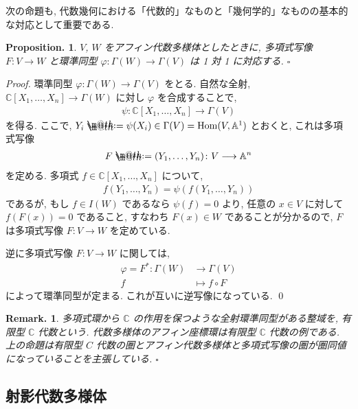 \documentclass[openany, a4paper, oneside]{jsbook}
\makeatletter
\newcommand*{\defeq}{\mathrel{\rlap{%
\raisebox{0.3ex}{$\m@th\cdot$}}%
\raisebox{-0.3ex}{$\m@th\cdot$}}%
=}
\theoremstyle{break}
\newtheorem{prop}[thm]{Proposition.}
\theoremstyle{breakdefn}
\newtheorem{rem}[thm]{Remark.}
\newcommand{\fin}{\hfill $\square$ \par}
\newcommand{\homo}{\mathrm{Hom}}
\newcommand{\map}{\longrightarrow}
\makeatother
\begin{document}
次の命題も, 代数幾何における「代数的」なものと「幾何学的」なものの基本的な対応として重要である.
\begin{prop}
$V$, $W$ をアフィン代数多様体としたときに,
多項式写像 $F \colon V \to W$ と環準同型 $\varphi \colon \Gamma (W) \to \Gamma (V)$ は 1 対 1 に対応する. \fin
\end{prop}
\begin{proof}
環準同型 $\varphi \colon \Gamma (W) \to \Gamma (V)$ をとる.
自然な全射, $\mathbb{C}[X_1,\dots,X_n] \to \Gamma (W)$ に対し $\varphi$ を合成することで,
\begin{align}
 \psi \colon \mathbb{C}[X_1,\dots,X_n] \map \Gamma (V)
\end{align}
を得る.
ここで, $Y_i \defeq  \psi (X_i) \in \Gamma (V) = \homo (V, \mathbb{A}^1)$ とおくと, これは多項式写像
\begin{align}
 F
 \defeq
 (Y_1,\dots,Y_n) \colon V \map \mathbb{A}^n
\end{align}
を定める.
多項式 $f \in \mathbb{C}[X_1,\dots,X_n]$ について,
\begin{align}
 f(Y_1,\dots,Y_n)
 =
 \psi(f(Y_1,\dots,Y_n))
\end{align}
であるが, もし $f \in I (W)$ であるなら $\psi (f)=0$ より,
任意の $x \in V$ に対して $f (F (x))=0$ であること,
すなわち $F (x) \in W$ であることが分かるので, $F$ は多項式写像 $F \colon V \to W$ を定めている.

逆に多項式写像 $F \colon V \to W$ に関しては,
\begin{align}
 \varphi
 =
 F^* \colon \Gamma (W)
 &\map
 \Gamma (V) \\
 f
 &\longmapsto
 f \circ F
\end{align}
によって環準同型が定まる.
これが互いに逆写像になっている. \qed
\end{proof}
\begin{rem}
多項式環から $\mathbb{C}$ の作用を保つような全射環準同型がある整域を,
有限型 $\mathbb{C}$ 代数という.
代数多様体のアフィン座標環は有限型 $\mathbb{C}$ 代数の例である.
上の命題は有限型 $C$ 代数の圏とアフィン代数多様体と多項式写像の圏が圏同値になっていることを主張している. \fin
\end{rem}
\subsection{射影代数多様体}
\end{document}
